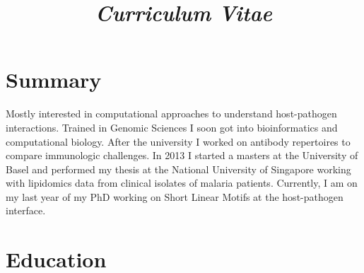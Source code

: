 \documentclass[11pt,a4paper,sans]{moderncv} %
\title{\emph{Curriculum Vitae}}
\begin{document}
\makecvtitle %
\vspace{-1.2cm}
\section{Summary}
Mostly interested in computational approaches to understand host-pathogen interactions. Trained in Genomic Sciences I soon got into bioinformatics and computational biology. After the university I worked on antibody repertoires to compare immunologic challenges. In 2013 I started a masters at the University of Basel and performed my thesis at the National University of Singapore working with lipidomics data from clinical isolates of malaria patients. Currently, I am on my last year of my PhD working on Short Linear Motifs at the host-pathogen interface.

\section{Education}


\end{document}
